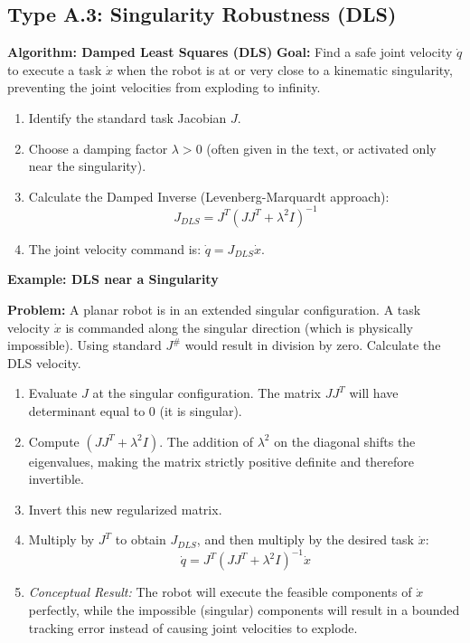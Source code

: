 \documentclass[11pt,a4paper]{article}
\begin{document}
\subsection{Type A.3: Singularity Robustness (DLS)}

 \textbf{Algorithm: Damped Least Squares (DLS)}
\textbf{Goal:} Find a safe joint velocity $\dot{q}$ to execute a task $\dot{x}$ when the robot is at or very close to a kinematic singularity, preventing the joint velocities from exploding to infinity.
\begin{enumerate}
    \item Identify the standard task Jacobian $J$.
    \item Choose a damping factor $\lambda > 0$ (often given in the text, or activated only near the singularity).
    \item Calculate the Damped Inverse (Levenberg-Marquardt approach):
    $$J_{DLS} = J^T(JJ^T + \lambda^2 I)^{-1}$$
    \item The joint velocity command is: $\dot{q} = J_{DLS} \dot{x}$.
\end{enumerate}

\vspace{0.3cm}
\noindent \textbf{\large Example: DLS near a Singularity}
\vspace{0.1cm}

\noindent \textbf{Problem:} A planar robot is in an extended singular configuration. A task velocity $\dot{x}$ is commanded along the singular direction (which is physically impossible). Using standard $J^\#$ would result in division by zero. Calculate the DLS velocity.
\begin{enumerate}
    \item Evaluate $J$ at the singular configuration. The matrix $JJ^T$ will have determinant equal to $0$ (it is singular).
    \item Compute $(JJ^T + \lambda^2 I)$. The addition of $\lambda^2$ on the diagonal shifts the eigenvalues, making the matrix strictly positive definite and therefore invertible.
    \item Invert this new regularized matrix.
    \item Multiply by $J^T$ to obtain $J_{DLS}$, and then multiply by the desired task $\dot{x}$:
    $$\dot{q} = J^T(JJ^T + \lambda^2 I)^{-1} \dot{x}$$
    \item \textit{Conceptual Result:} The robot will execute the feasible components of $\dot{x}$ perfectly, while the impossible (singular) components will result in a bounded tracking error instead of causing joint velocities to explode.
\end{enumerate}
\end{document}
